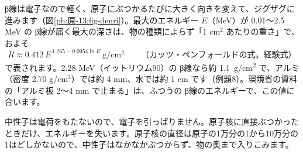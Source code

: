β線は電子なので軽く、原子にぶつかるたびに大きく向きを変えて、ジグザグに進みます（図\ref{ph:原-13:fig-denri}）。最大のエネルギー $E$（MeV）が 0.01〜2.5 MeV の β線が届く最大の深さは、物の種類によらず「1 cm$^2$ あたりの重さ」で、およそ
\[ R\approx0.412\,E^{\,1.265-0.0954\ln E}\ \text{g/cm$^2$}\qquad\text{（カッツ・ペンフォールドの式。経験式）} \]
で表されます。2.28 MeV（イットリウム90）の β線なら約 \qty{1.1}{g/cm^2} で、アルミ（密度 2.70 g/cm$^3$）では約 4 mm、水では約 1 cm です（例題8）。環境省の資料の「アルミ板 2〜4 mm で止まる」は、ふつうの β線のエネルギーで、この値に合います。

\begin{phmodel}
\end{phmodel}

\label{ph:原-13:sec6}
中性子は電荷をもたないので、電子を引っぱりません。原子核に直接ぶつかったときだけ、エネルギーを失います。原子核の直径は原子の1万分の1から10万分の1ほどしかないので、中性子はなかなかぶつからず、物の奥まで入りこみます。

